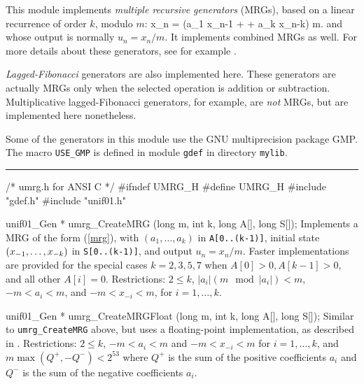
This module implements {\em multiple recursive generators\/} (MRGs),
based on a linear recurrence of order $k$, modulo $m$:
\eq
   x_n = (a_1 x_{n-1} + \cdots + a_k x_{n-k}) \mod m.    
\endeq
and whose output is normally $u_n = x_n / m$.
It implements combined MRGs as well.
For more details about these generators, see for example
\cite {rLEC93a,rLEC94a,rLEC96b,rLEC99b,rLEC00b,rNIE92b}.

{\em Lagged-Fibonacci\/} generators are also implemented here.
These generators are actually MRGs only when the selected operation
is addition or subtraction.
Multiplicative lagged-Fibonacci generators, for example, are {\em not\/}
MRGs, but are implemented here nonetheless.

Some of the generators in this module use the GNU multiprecision package GMP. 
The macro {\tt USE\_GMP} is defined in module {\tt gdef} in directory
{\tt mylib}.

\bigskip
\hrule
\code
\hide
/*  umrg.h  for ANSI C  */
#ifndef UMRG_H
#define UMRG_H
\endhide
#include "gdef.h"
#include "unif01.h"
\endcode




\code
unif01_Gen * umrg_CreateMRG (long m, int k, long A[], long S[]);
\endcode
  \tab  Implements a MRG of the form (\ref{mrg}), with
   $(a_1,\dots,a_k)$ in {\tt A[0..(k-1)]}, initial state
   $(x_{-1},\dots,\?x_{-k})$ in {\tt S[0..(k-1)]}, and output
   $u_n = x_n / m$.
%
   Faster implementations are provided for the special cases
   $k =2, 3, 5, 7$ when
   $A[0] > 0, A[k-1] > 0$, and all other $A[i] = 0$.
   Restrictions: $2 \le k$, $|a_i| (m \mod |a_i|) < m$,
   $-m < a_i < m$, and $-m < x_{-i} < m$, for $i = 1,\dots,k$.
 \endtab
\code


unif01_Gen * umrg_CreateMRGFloat (long m, int k, long A[], long S[]);
\endcode
  \tab Similar to {\tt umrg\_CreateMRG} above, but uses a floating-point
   implementation, as described in \cite{rLEC99b}.
   Restrictions: $2 \le k$,
   $-m < a_i < m$ and $-m < x_{-i} < m$ for $i = 1,\dots,k$, and
   $m \max (Q^+, -Q^-) < 2^{53}$
   where $Q^+$ is the sum of the positive coefficients $a_i$ 
   and $Q^-$ is the sum of the negative coefficients $a_i$.
 \endtab
\code



